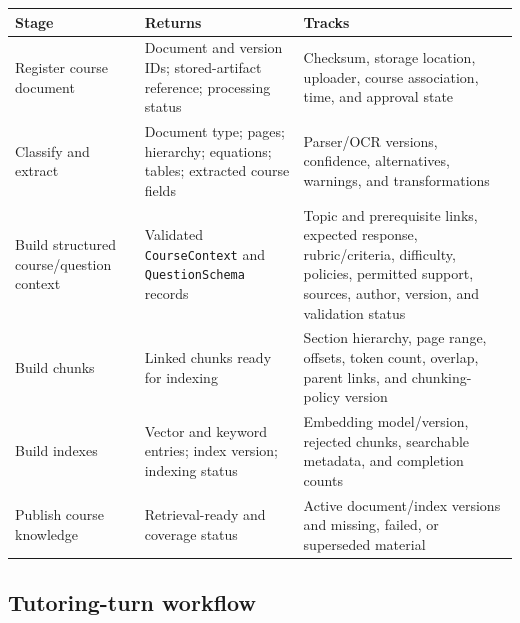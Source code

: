 \documentclass[11pt]{article}
\begin{document}
\noindent\begin{tabularx}{\textwidth}{@{}p{}p{}X@{}}
\toprule
\textbf{Stage} & \textbf{Returns} & \textbf{Tracks} \\
\midrule
Register course document & Document and version IDs; stored-artifact reference; processing status & Checksum, storage location, uploader, course association, time, and approval state \\
Classify and extract & Document type; pages; hierarchy; equations; tables; extracted course fields & Parser/OCR versions, confidence, alternatives, warnings, and transformations \\
Build structured course/question context & Validated \texttt{CourseContext} and \texttt{QuestionSchema} records & Topic and prerequisite links, expected response, rubric/criteria, difficulty, policies, permitted support, sources, author, version, and validation status \\
Build chunks & Linked chunks ready for indexing & Section hierarchy, page range, offsets, token count, overlap, parent links, and chunking-policy version \\
Build indexes & Vector and keyword entries; index version; indexing status & Embedding model/version, rejected chunks, searchable metadata, and completion counts \\
Publish course knowledge & Retrieval-ready and coverage status & Active document/index versions and missing, failed, or superseded material \\
\bottomrule
\end{tabularx}

\subsection{Tutoring-turn workflow}
\end{document}
